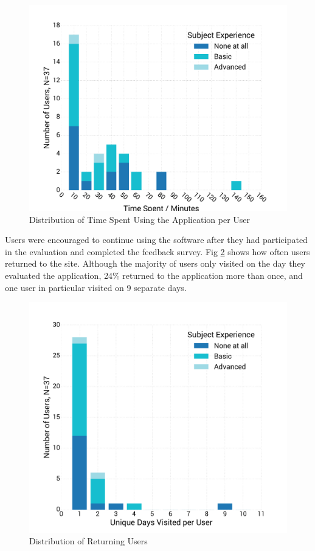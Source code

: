 \documentclass[bsc,twoside,singlespacing,parskip,logo,notimes,normalheadings]{infthesis}
\begin{document}
    \begin{figure}[!hb]
      \centering
      \vspace{-2mm}
      \includegraphics[width=.80\textwidth, trim=0 20 0 45, clip]{img/time_distribution.pdf}
      \captionsetup{width=\textwidth, justification=centering}
      \caption{Distribution of Time Spent Using the Application per User}\label{fig:time-hist}
    \end{figure}

    Users were encouraged to continue using the software after they
    had participated in the evaluation and completed the feedback
    survey. Fig \ref{fig:days-spent} shows how often users returned to
    the site. Although the majority of users only visited on the day
    they evaluated the application, 24\% returned to the application
    more than once, and one user in particular visited on 9 separate
    days.

    \begin{figure}[!htb]
      \centering
      \captionsetup{width=\textwidth, justification=centering}
      \caption{Distribution of Returning Users}\label{fig:days-spent}
      \includegraphics[width=.80\textwidth, trim=0 120 0 25]{img/unique_days.pdf}
    \end{figure}
\end{document}
